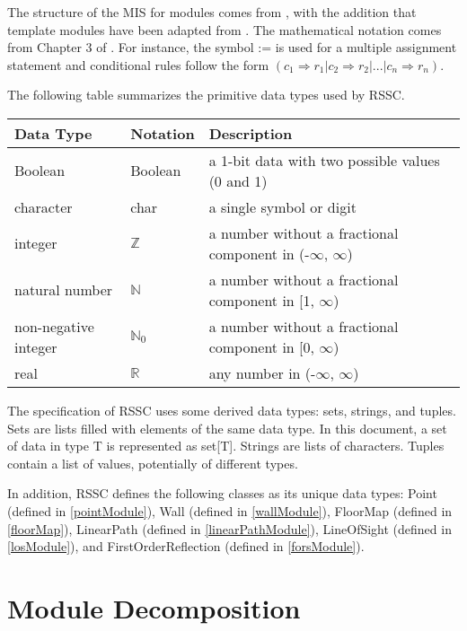 \documentclass[12pt, titlepage]{article}
\begin{document}
The structure of the MIS for modules comes from \citet{HoffmanAndStrooper1995},
with the addition that template modules have been adapted from
\cite{GhezziEtAl2003}.  The mathematical notation comes from Chapter 3 of
\citet{HoffmanAndStrooper1995}.  For instance, the symbol := is used for a
multiple assignment statement and conditional rules follow the form $(c_1
\Rightarrow r_1 | c_2 \Rightarrow r_2 | ... | c_n \Rightarrow r_n )$.

The following table summarizes the primitive data types used by RSSC. 

\begin{center}
\renewcommand{\arraystretch}{1.2}
\noindent 
\begin{tabular}{l l p{7.5cm}} 
\toprule 
\textbf{Data Type} & \textbf{Notation} & \textbf{Description}\\ 
\midrule
Boolean & Boolean & a 1-bit data with two possible values (0 and 1)\\
character & char & a single symbol or digit\\
integer & $\mathbb{Z}$ & a number without a fractional component in (-$\infty$, $\infty$) \\
natural number & $\mathbb{N}$ & a number without a fractional component in [1, $\infty$) \\
non-negative integer & $\mathbb{N}_0$ & a number without a fractional component in [0, $\infty$) \\
real & $\mathbb{R}$ & any number in (-$\infty$, $\infty$)\\

\bottomrule
\end{tabular} 
\end{center}

\noindent
The specification of RSSC uses some derived data types: sets, strings, and
tuples. Sets are lists filled with elements of the same data type. In this document, a set of data in type T is represented as set[T]. Strings are lists of characters. Tuples contain a list of values, potentially of different types.

In addition, RSSC defines the following classes as its unique data types: Point (defined in
\autoref{pointModule}), Wall (defined in \autoref{wallModule}), FloorMap (defined in \autoref{floorMap}), LinearPath (defined in \autoref{linearPathModule}), LineOfSight (defined in \autoref{losModule}), and FirstOrderReflection (defined in \autoref{forsModule}). 

\section{Module Decomposition}
\end{document}
